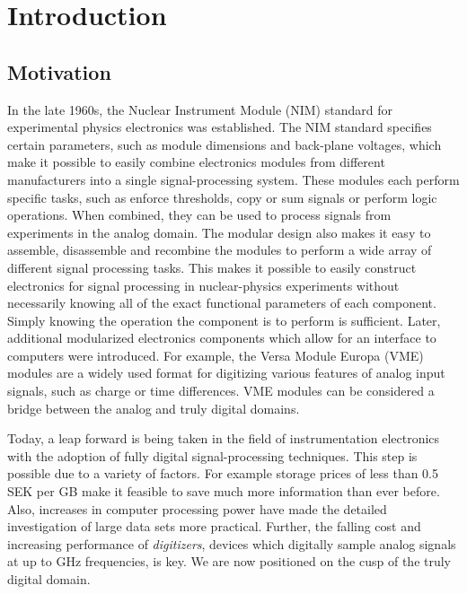 \documentclass[main.tex]{subfiles}
\begin{document}
\chapter{Introduction}\label{ch:1}
\section{Motivation}
In the late 1960s, the Nuclear Instrument Module (NIM) standard for experimental physics electronics was established. The NIM standard specifies certain parameters, such as module dimensions and back-plane voltages, which make it possible to easily combine electronics modules from different manufacturers into a single signal-processing system. These modules each perform specific tasks, such as enforce thresholds, copy or sum signals or perform logic operations. When combined, they can be used to process signals from experiments in the analog domain. The modular design also makes it easy to assemble, disassemble and recombine the modules to perform a wide array of different signal processing tasks. 
This makes it possible to easily construct electronics for signal processing in nuclear-physics experiments without necessarily knowing all of the exact functional parameters of each component. Simply knowing the operation the component is to perform is sufficient. Later, additional modularized electronics components which allow for an interface to computers were introduced. For example, the Versa Module Europa (VME) modules are a widely used format for digitizing various features of analog input signals, such as charge or time differences. VME modules can be considered a bridge between the analog and truly digital domains.

Today, a leap forward is being taken in the field of instrumentation electronics with the adoption of fully digital signal-processing techniques. This step is possible due to a variety of factors. For example storage prices of less than 0.5 SEK per GB make it feasible to save much more information than ever before. Also, increases in computer processing power have made the detailed investigation of large data sets more practical. Further, the falling cost and increasing performance of \textit{digitizers}, devices which digitally sample analog signals at up to GHz frequencies, is key. We are now positioned on the cusp of the truly digital domain.
\end{document}
